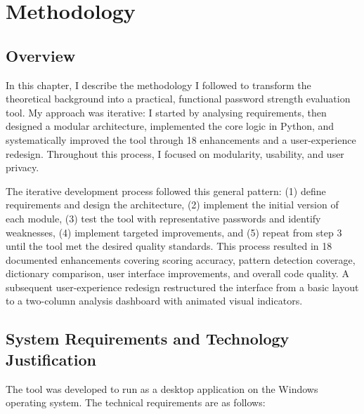 \chapter{Methodology}

\section{Overview}

In this chapter, I describe the methodology I followed to transform the theoretical background into a practical, functional password strength evaluation tool. My approach was iterative: I started by analysing requirements, then designed a modular architecture, implemented the core logic in Python, and systematically improved the tool through 18 enhancements and a user-experience redesign. Throughout this process, I focused on modularity, usability, and user privacy.

The iterative development process followed this general pattern: (1) define requirements and design the architecture, (2) implement the initial version of each module, (3) test the tool with representative passwords and identify weaknesses, (4) implement targeted improvements, and (5) repeat from step 3 until the tool met the desired quality standards. This process resulted in 18 documented enhancements covering scoring accuracy, pattern detection coverage, dictionary comparison, user interface improvements, and overall code quality. A subsequent user-experience redesign restructured the interface from a basic layout to a two-column analysis dashboard with animated visual indicators.

\clearpage

\section{System Requirements and Technology Justification}

The tool was developed to run as a desktop application on the Windows operating system. The technical requirements are as follows:

